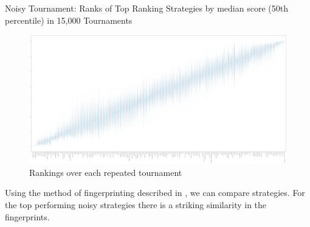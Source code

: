 \documentclass{article}
\begin{document}
\begin{table}[!hbtp]
    \centering
        
        \caption{Noisy Tournament: Ranks of Top Ranking Strategies
        by median score (50th percentile) in 15,000 Tournaments}
        \label{tbl:noisy_ranks}
\end{table}

\begin{landscape}
    \begin{figure}[!hbtp]
        \centering
        \includegraphics[width=\textwidth]{./assets/noisy_ranks_boxplots.pdf}
        \caption{Rankings over each repeated tournament}
        \label{fig:noisy_ranks_boxplot}
    \end{figure}
\end{landscape}

Using the method of fingerprinting described in \cite{ashlock2008fingerprinting}
\cite{ashlock2009fingerprint}, we can compare
strategies. For the top performing noisy strategies there is a striking similarity
in the fingerprints.
\end{document}
